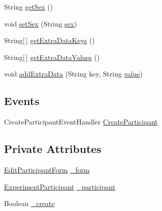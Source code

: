 \begin{DoxyCompactItemize}
String \hyperlink{class_web_analyzer_1_1_u_i_1_1_interaction_objects_1_1_participant_control_aa6fff7010ab96f3305ef55da8697c636}{get\+Sex} ()
\item 
void \hyperlink{class_web_analyzer_1_1_u_i_1_1_interaction_objects_1_1_participant_control_a889ab843cc8afc4fb322c167f255baa8}{set\+Sex} (String \hyperlink{bin_2x64_2_release_2_u_i_2_h_t_m_l_resources_2js_2src_2edit__participant_8js_a92ac1efb4297eef6e7eed30fca1f3e8e}{sex})
\item 
String\mbox{[}$\,$\mbox{]} \hyperlink{class_web_analyzer_1_1_u_i_1_1_interaction_objects_1_1_participant_control_a28a3491cdd7ee8a3be6da78a83d154d4}{get\+Extra\+Data\+Keys} ()
\item 
String\mbox{[}$\,$\mbox{]} \hyperlink{class_web_analyzer_1_1_u_i_1_1_interaction_objects_1_1_participant_control_a6bd9c0492867f0c71038065afea17312}{get\+Extra\+Data\+Values} ()
\item 
void \hyperlink{class_web_analyzer_1_1_u_i_1_1_interaction_objects_1_1_participant_control_adbcd1d9e24fe7d5bcf2f68c618cabfe1}{add\+Extra\+Data} (String key, String \hyperlink{_u_i_2_h_t_m_l_resources_2js_2lib_2underscore_8min_8js_af7e1471ab89699458c4df8bb657298f6}{value})
\end{DoxyCompactItemize}
\subsection*{Events}
\begin{DoxyCompactItemize}
\item 
Create\+Participant\+Event\+Handler \hyperlink{class_web_analyzer_1_1_u_i_1_1_interaction_objects_1_1_participant_control_a05567dca7355e947bf348985f4227d36}{Create\+Participant}
\end{DoxyCompactItemize}
\subsection*{Private Attributes}
\begin{DoxyCompactItemize}
\item 
\hyperlink{class_web_analyzer_1_1_u_i_1_1_edit_participant_form}{Edit\+Participant\+Form} \hyperlink{class_web_analyzer_1_1_u_i_1_1_interaction_objects_1_1_participant_control_ab9a43552c6e7c3b421ddc4d1a4c3dc2b}{\+\_\+form}
\item 
\hyperlink{class_web_analyzer_1_1_models_1_1_base_1_1_experiment_participant}{Experiment\+Participant} \hyperlink{class_web_analyzer_1_1_u_i_1_1_interaction_objects_1_1_participant_control_ae7f805fadde2e1d9088c751bc5860b94}{\+\_\+participant}
\item 
Boolean \hyperlink{class_web_analyzer_1_1_u_i_1_1_interaction_objects_1_1_participant_control_a9526dab215a152dae475ec8b6098f15d}{\+\_\+create}
\end{DoxyCompactItemize}
